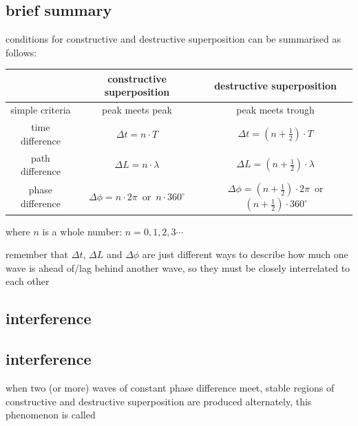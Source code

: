 \subsection*{brief summary}

conditions for constructive and destructive superposition can be summarised as follows:

\begin{center}
{\renewcommand{\arraystretch}{1.25}
\begin{tabular}{|c|c|c|}
	\hline
	& constructive superposition & destructive superposition \\
	\hline
	simple criteria & peak meets peak & peak meets trough \\
	\hline
	time difference & $\Delta t = n \cdot T$ & $\Delta t = \left(n+\frac{1}{2}\right) \cdot T$ \\
	\hline
	path difference & $\Delta L = n \cdot \lambda$ & $\Delta L = \left(n+\frac{1}{2}\right) \cdot \lambda$ \\
	\hline
	phase difference & $\Delta \phi = n\cdot 2\pi\,$ or $\,n\cdot 360^\circ$ & $\Delta \phi = \left(n+\frac{1}{2}\right)\cdot 2\pi \,$ or $\,\left(n+\frac{1}{2}\right)\cdot 360^\circ$ \\
	\hline
\end{tabular}
}
\end{center}

where $n$ is a whole number: $n=0, 1, 2, 3 \cdots$

remember that $\Delta t$, $\Delta L$ and $\Delta \phi$ are just different ways to describe how much one wave is ahead of/lag behind another wave, so they must be closely interrelated to each other






\subsection{interference}

\subsection{interference}

when two (or more) waves of constant phase difference meet, stable regions of constructive and destructive superposition are produced alternately, this phenomenon is called 



